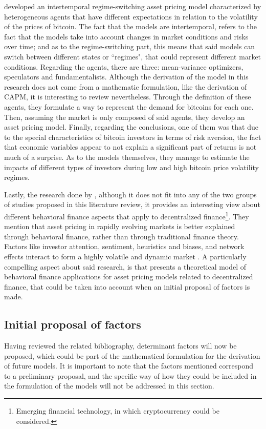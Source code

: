 \parencite{koutmos2021intertemporal} developed an intertemporal regime-switching asset pricing model characterized by heterogeneous agents that have different expectations in relation to the volatility of the prices of bitcoin. The fact that the models are intertemporal, refers to the fact that the models take into account changes in market conditions and risks over time; and as to the regime-switching part, this means that said models can switch between different states or ``regimes", that could represent different market conditions. Regarding the agents, there are three: mean-variance optimizers, speculators and fundamentalists. Although the derivation of the model in this research does not come from a mathematic formulation, like the derivation of CAPM, it is interesting to review nevertheless. Through the definition of these agents, they formulate a way to represent the demand for bitcoins for each one. Then, assuming the market is only composed of said agents, they develop an asset pricing model. Finally, regarding the conclusions, one of them was that due to the special characteristics of bitcoin investors in terms of risk aversion, the fact that economic variables appear to not explain a significant part of returns is not much of a surprise. As to the models themselves, they manage to estimate the impacts of different types of investors during low and high bitcoin price volatility regimes.

Lastly, the research done by \parencite{Bennett2023}, although it does not fit into any of the two groups of studies proposed in this literature review, it provides an interesting view about different behavioral finance aspects that apply to decentralized finance\footnote{Emerging financial technology, in which cryptocurrency could be considered.}. They mention that asset pricing in rapidly evolving markets is better explained through behavioral finance, rather than through traditional finance theory. Factors like investor attention, sentiment, heuristics and biases, and network effects interact to form a highly volatile and dynamic market \parencite{Bennett2023}. A particularly compelling aspect about said research, is that presents a theoretical model of behavioral finance applications for asset pricing models related to decentralized finance, that could be taken into account when an initial proposal of factors is made. 

\subsection{Initial proposal of factors}
Having reviewed the related bibliography, determinant factors will now be proposed, which could be part of the mathematical formulation for the derivation of future models. It is important to note that the factors mentioned correspond to a preliminary proposal, and the specific way of how they could be included in the formulation of the models will not be addressed in this section.

